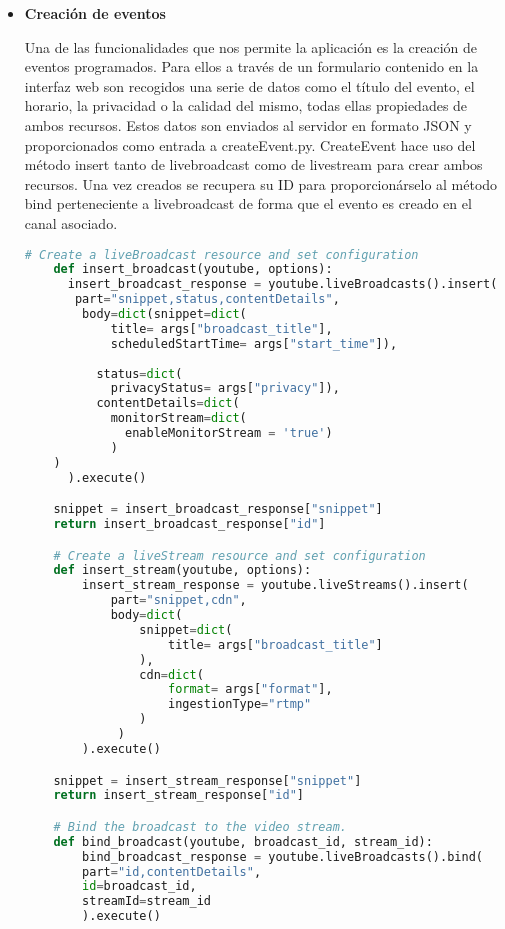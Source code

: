 \begin{itemize}
    \item \textbf{Creación de eventos}
    
    Una de las funcionalidades que nos permite la aplicación es la creación de eventos programados. Para ellos a través de un formulario contenido en la interfaz web son recogidos una serie de datos como el título del evento, el horario, la privacidad o la calidad del mismo, todas ellas propiedades de ambos recursos. Estos datos son enviados al servidor en formato JSON y proporcionados como entrada a createEvent.py.  CreateEvent hace uso del método insert tanto de livebroadcast como de livestream para crear ambos recursos. Una vez creados se recupera su ID para proporcionárselo al método bind perteneciente a livebroadcast de forma que el evento es creado en el canal asociado.
\\  
    \begin{lstlisting}[language=Python]
    # Create a liveBroadcast resource and set configuration
    def insert_broadcast(youtube, options):
      insert_broadcast_response = youtube.liveBroadcasts().insert(
       part="snippet,status,contentDetails",
        body=dict(snippet=dict(
            title= args["broadcast_title"],
            scheduledStartTime= args["start_time"]),
    
          status=dict(
            privacyStatus= args["privacy"]),
          contentDetails=dict(
            monitorStream=dict(
              enableMonitorStream = 'true')
            )  
    )
      ).execute()

    snippet = insert_broadcast_response["snippet"]
    return insert_broadcast_response["id"]

    # Create a liveStream resource and set configuration
    def insert_stream(youtube, options):
        insert_stream_response = youtube.liveStreams().insert(
            part="snippet,cdn",
            body=dict(
                snippet=dict(
                    title= args["broadcast_title"]
                ),
                cdn=dict(
                    format= args["format"],
                    ingestionType="rtmp"
                )
             )
        ).execute()

    snippet = insert_stream_response["snippet"]
    return insert_stream_response["id"]

    # Bind the broadcast to the video stream.
    def bind_broadcast(youtube, broadcast_id, stream_id):
        bind_broadcast_response = youtube.liveBroadcasts().bind(
        part="id,contentDetails",
        id=broadcast_id,
        streamId=stream_id
        ).execute()
    \end{lstlisting}
    

\end{itemize}
